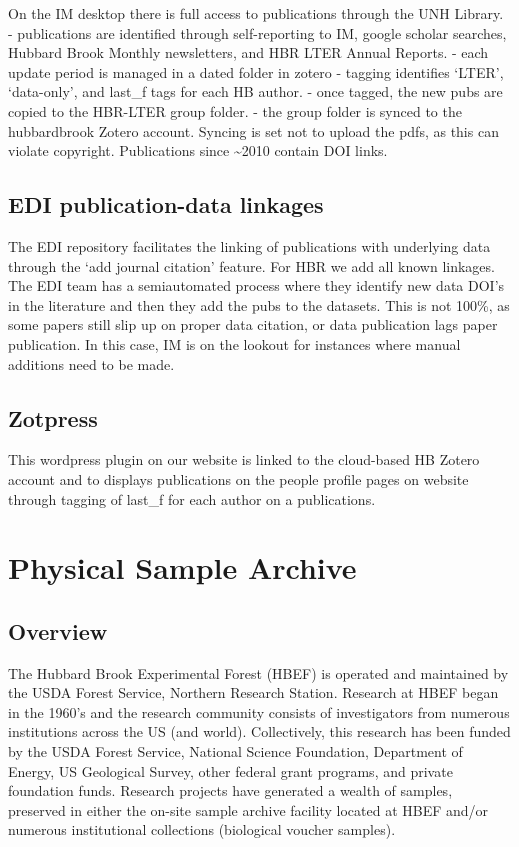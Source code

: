 \documentclass[
  letterpaper,
  DIV=11,
  numbers=noendperiod]{scrreprt}
\begin{document}
On the IM desktop there is full access to publications through the UNH
Library. - publications are identified through self-reporting to IM,
google scholar searches, Hubbard Brook Monthly newsletters, and HBR LTER
Annual Reports. - each update period is managed in a dated folder in
zotero - tagging identifies `LTER', `data-only', and last\_f tags for
each HB author. - once tagged, the new pubs are copied to the HBR-LTER
group folder. - the group folder is synced to the hubbardbrook Zotero
account. Syncing is set not to upload the pdfs, as this can violate
copyright. Publications since \textasciitilde2010 contain DOI links.

\section{EDI publication-data
linkages}\label{edi-publication-data-linkages}

The EDI repository facilitates the linking of publications with
underlying data through the `add journal citation' feature. For HBR we
add all known linkages. The EDI team has a semiautomated process where
they identify new data DOI's in the literature and then they add the
pubs to the datasets. This is not 100\%, as some papers still slip up on
proper data citation, or data publication lags paper publication. In
this case, IM is on the lookout for instances where manual additions
need to be made.

\section{Zotpress}\label{zotpress}

This wordpress plugin on our website is linked to the cloud-based HB
Zotero account and to displays publications on the people profile pages
on website through tagging of last\_f for each author on a publications.


\chapter{Physical Sample Archive}\label{physical-sample-archive}

\section{Overview}\label{overview-4}

The Hubbard Brook Experimental Forest (HBEF) is operated and maintained
by the USDA Forest Service, Northern Research Station. Research at HBEF
began in the 1960's and the research community consists of investigators
from numerous institutions across the US (and world). Collectively, this
research has been funded by the USDA Forest Service, National Science
Foundation, Department of Energy, US Geological Survey, other federal
grant programs, and private foundation funds. Research projects have
generated a wealth of samples, preserved in either the on-site sample
archive facility located at HBEF and/or numerous institutional
collections (biological voucher samples).
\end{document}
